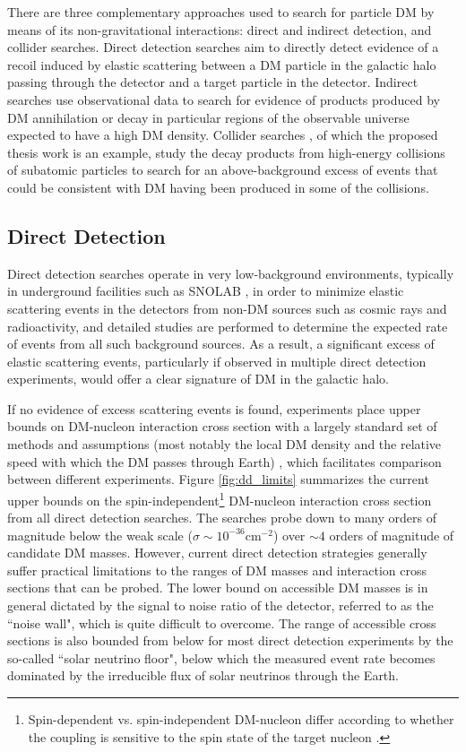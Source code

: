 There are three complementary approaches used to search for particle DM by means of its non-gravitational interactions: direct and indirect detection, and collider searches. Direct detection searches \cite{billard2021direct} aim to directly detect evidence of a recoil induced by elastic scattering between a DM particle in the galactic halo passing through the detector and a target particle in the detector. Indirect searches \cite{CIRELLI_2012, conrad} use observational data to search for evidence of products produced by DM annihilation or decay in particular regions of the observable universe expected to have a high DM density. Collider searches \cite{DM_colliders}, of which the proposed thesis work is an example, study the decay products from high-energy collisions of subatomic particles to search for an above-background excess of events that could be consistent with DM having been produced in some of the collisions.

\subsection{Direct Detection}

Direct detection searches operate in very low-background environments, typically in underground facilities such as SNOLAB \cite{Lawson_2020}, in order to minimize elastic scattering events in the detectors from non-DM sources such as cosmic rays and radioactivity, and detailed studies are performed to determine the expected rate of events from all such background sources. As a result, a significant excess of elastic scattering events, particularly if observed in multiple direct detection experiments, would offer a clear signature of DM in the galactic halo. 

If no evidence of excess scattering events is found, experiments place upper bounds on DM-nucleon interaction cross section with a largely standard set of methods and assumptions (most notably the local DM density and the relative speed with which the DM passes through Earth) \cite{dd_results_standards_2021}, which facilitates comparison between different experiments. Figure \ref{fig:dd_limits} summarizes the current upper bounds on the spin-independent\footnote{Spin-dependent vs. spin-independent DM-nucleon differ according to whether the coupling is sensitive to the spin state of the target nucleon \cite{billard2021direct}.} DM-nucleon interaction cross section from all direct detection searches. The searches probe down to many orders of magnitude below the weak scale (\(\sigma\sim10^{-36}\)cm\(^{-2}\)) over \(\sim4\) orders of magnitude of candidate DM masses. However, current direct detection strategies generally suffer practical limitations to the ranges of DM masses and interaction cross sections that can be probed. The lower bound on accessible DM masses is in general dictated by the signal to noise ratio of the detector, referred to as the ``noise wall", which is quite difficult to overcome. The range of accessible cross sections is also bounded from below for most direct detection experiments by the so-called ``solar neutrino floor", below which the measured event rate becomes dominated by the irreducible flux of solar neutrinos through the Earth. 

